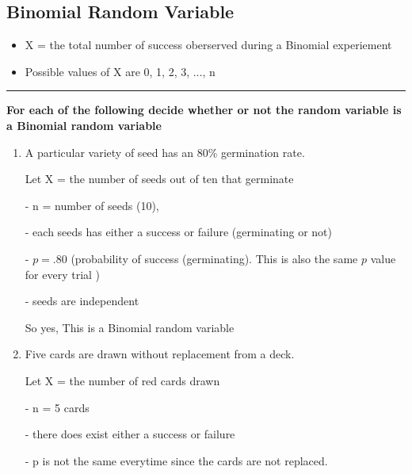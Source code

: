 \documentclass{report}
\begin{document}
\subsection*{Binomial Random Variable}
\begin{itemize}
  \item X = the total number of success oberserved during a Binomial experiement 
  \item Possible values of X are 0, 1, 2, 3, $\ldots$, n
\end{itemize}
\bigbreak \noindent
\hrule
\bigbreak \noindent
\q
\bigbreak \noindent
\textbf{For each of the following decide whether or not the random variable is a Binomial random variable}
  \bigbreak \noindent
  \begin{enumerate}
    \item A particular variety of seed has an 80\% germination rate. 
      
      \noindent Let X = the number of seeds out of ten that germinate
      \vspace{2mm}

      \subitem  - n = number of seeds (10), 
      \vspace{2mm}

      \subitem - each seeds has either a success or failure (germinating or not)  
      \vspace{2mm}

      \subitem - $p = .80$ (probability of success (germinating). This is also the same $p$ value for every trial ) 
      \vspace{2mm}

      \subitem - seeds are independent
      \vspace{2mm}
      
      \subitem So yes, This is a Binomial random variable

    \item Five cards are drawn without replacement from a deck.

      Let X = the number of red cards drawn
      \vspace{2mm}

      \subitem - n = 5 cards 
      \vspace{2mm}

      \subitem - there does exist either a success or failure 
      \vspace{2mm}

      \subitem - p is not the same everytime since the cards are not replaced.
      \vspace{2mm} 


\end{enumerate}
\end{document}
